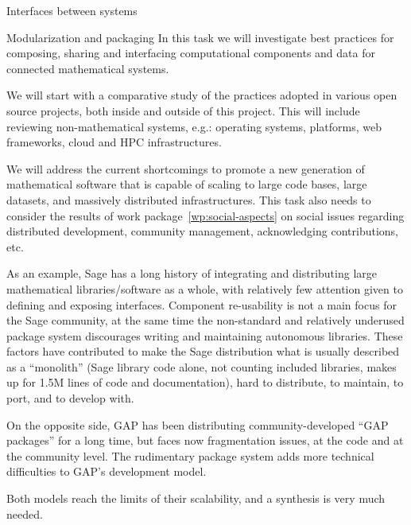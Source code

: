 \begin{Workpackage}{\thewpno}
\begin{task}{Interfaces between systems}
  \end{task}

  \begin{task}{Modularization and packaging}
    In this task we will investigate best practices for composing,
    sharing and interfacing computational components and data for
    connected mathematical systems.

    We will start with a comparative study of the practices adopted in
    various open source projects, both inside and outside of this
    project. This will include reviewing non-mathematical systems,
    e.g.: operating systems, platforms, web frameworks, cloud and HPC
    infrastructures.

    We will address the current shortcomings to promote a new
    generation of mathematical software that is capable of scaling to
    large code bases, large datasets, and massively distributed
    infrastructures. This task also needs to consider the results of
    work package~\ref{wp:social-aspects} on social issues regarding
    distributed development, community management, acknowledging
    contributions, etc.

    As an example, Sage has a long history of integrating and
    distributing large mathematical libraries/software as a whole,
    with relatively few attention given to defining and exposing
    interfaces. Component re-usability is not a main focus for the
    Sage community, at the same time the non-standard and relatively
    underused package system discourages writing and maintaining
    autonomous libraries. These factors have contributed to make the
    Sage distribution what is usually described as a ``monolith''
    (Sage library code alone, not counting included libraries, makes
    up for 1.5M lines of code and documentation), hard to distribute,
    to maintain, to port, and to develop with.

    On the opposite side, GAP has been distributing
    community-developed ``GAP packages'' for a long time, but faces
    now fragmentation issues, at the code and at the community
    level. The rudimentary package system adds more technical
    difficulties to GAP's development model.

    Both models reach the limits of their scalability, and a synthesis
    is very much needed.
  \end{task}
  

\end{Workpackage}
